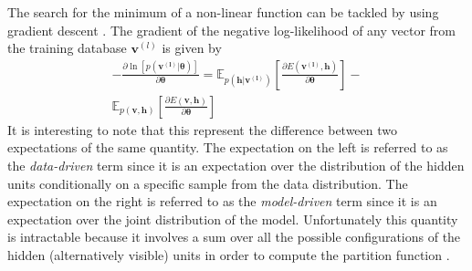 \documentclass[letterpaper]{article}
\begin{document}
The search for the minimum of a non-linear function can be tackled by using gradient descent \cite{bottou2010large}. The gradient of the negative log-likelihood of any vector from the training database $\bm{v}^{(l)}$ is given by
\begin{equation}
\begin{split}
- \frac{\partial \ln \left[ p(\bm{v^{(l)}}|\bm{\theta})\right]}{\partial \bm{\theta}} 
= 
\mathbb{E}_{p(\bm{h}|\bm{v^{(l)}})} \left[ \frac{\partial E(\bm{v^{(l)}},\bm{h})}{\partial \bm{\theta}} \right] 
- \\
\mathbb{E}_{p(\bm{v} , \bm{h})} \left[ \frac{\partial E(\bm{v},\bm{h})}{\partial \bm{\theta}} \right]
\end{split}
\end{equation}
It is interesting to note that this represent the difference between two expectations of the same quantity. The expectation on the left is referred to as the \textit{data-driven} term since it is an expectation over the distribution of the hidden units conditionally on a specific sample from the data distribution. The expectation on the right is referred to as the \textit{model-driven} term since it is an expectation over the joint distribution of the model.
Unfortunately this quantity is intractable because it involves a sum over all the possible configurations of the hidden (alternatively visible) units in order to compute the partition function \cite{Fischer2012}.
\end{document}
